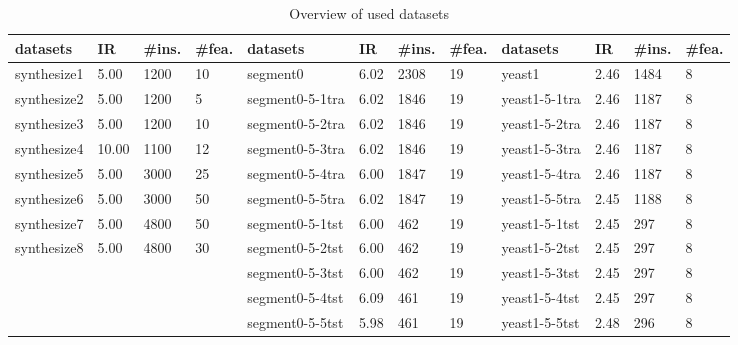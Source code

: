 \documentclass{article}
\begin{document}
\begin{table}[!ht] \tiny
	\centering
\begin{tabular}{|l||l|l|l||l||l|l|l||l||l|l|l|} 
	\hline
datasets    & IR    & \#ins. & \#fea. & datasets        & IR   & \#ins. & \#fea. & datasets      & IR   & \#ins. & \#fea. \\ \hline \hline
synthesize1 & 5.00  & 1200       & 10        & segment0        & 6.02 & 2308       & 19        & yeast1        & 2.46 & 1484       & 8         \\ \hline
synthesize2 & 5.00  & 1200       & 5         & segment0-5-1tra & 6.02 & 1846       & 19        & yeast1-5-1tra & 2.46 & 1187       & 8         \\ \hline
synthesize3 & 5.00  & 1200       & 10        & segment0-5-2tra & 6.02 & 1846       & 19        & yeast1-5-2tra & 2.46 & 1187       & 8         \\ \hline
synthesize4 & 10.00 & 1100       & 12        & segment0-5-3tra & 6.02 & 1846       & 19        & yeast1-5-3tra & 2.46 & 1187       & 8         \\ \hline
synthesize5 & 5.00  & 3000       & 25        & segment0-5-4tra & 6.00 & 1847       & 19        & yeast1-5-4tra & 2.46 & 1187       & 8         \\ \hline
synthesize6 & 5.00  & 3000       & 50        & segment0-5-5tra & 6.02 & 1847       & 19        & yeast1-5-5tra & 2.45 & 1188       & 8         \\ \hline
synthesize7 & 5.00  & 4800       & 50        & segment0-5-1tst & 6.00 & 462        & 19        & yeast1-5-1tst & 2.45 & 297        & 8         \\ \hline
synthesize8 & 5.00  & 4800       & 30        & segment0-5-2tst & 6.00 & 462        & 19        & yeast1-5-2tst & 2.45 & 297        & 8         \\ \hline
&       &            &           & segment0-5-3tst & 6.00 & 462        & 19        & yeast1-5-3tst & 2.45 & 297        & 8         \\ \hline
&       &            &           & segment0-5-4tst & 6.09 & 461        & 19        & yeast1-5-4tst & 2.45 & 297        & 8         \\ \hline
&       &            &           & segment0-5-5tst & 5.98 & 461        & 19        & yeast1-5-5tst & 2.48 & 296        & 8         \\ \hline
\end{tabular}
	\label{tab:overview}
	\caption{Overview of used datasets}
\end{table}
\end{document}
